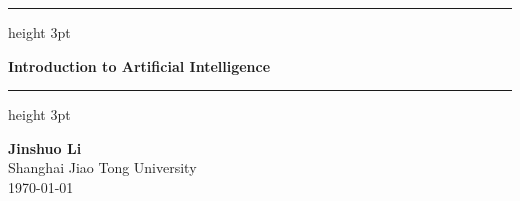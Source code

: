 \documentclass[oneside]{book}
\begin{document}
\begin{titlepage}


    \vspace*{3cm}
    {\color{elegantblue}\hrule height 3pt}
    \vspace{1cm}

    \noindent
    {\Huge \bfseries \color{elegantblue} Introduction to Artificial Intelligence\par}

    \vspace{1cm}
    {\color{elegantblue}\hrule height 3pt}

    \vfill
    \begin{flushleft}
        {\Large \textbf{Jinshuo Li}}\\[15pt]
        {\large Shanghai Jiao Tong University}\\[8pt]
        {\large \today}
    \end{flushleft}
    \vspace{2cm}
\end{titlepage}
\thispagestyle{empty}


\cleardoublepage

\tableofcontents
\thispagestyle{empty}

\cleardoublepage





\end{document}
